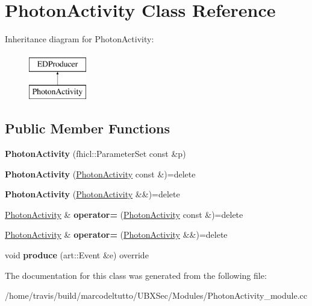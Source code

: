 \hypertarget{classPhotonActivity}{\section{Photon\-Activity Class Reference}
\label{classPhotonActivity}
}
Inheritance diagram for Photon\-Activity\-:\begin{figure}[H]
\begin{center}
\leavevmode
\includegraphics[height=2.000000cm]{classPhotonActivity}
\end{center}
\end{figure}
\subsection*{Public Member Functions}
\begin{DoxyCompactItemize}
\item 
\hypertarget{classPhotonActivity_a76dfd63b90435e0b7ec3b74ee15f7ac2}{{\bfseries Photon\-Activity} (fhicl\-::\-Parameter\-Set const \&p)}\label{classPhotonActivity_a76dfd63b90435e0b7ec3b74ee15f7ac2}

\item 
\hypertarget{classPhotonActivity_ac57409a0d4ddb84c398cb1f48e0be2ba}{{\bfseries Photon\-Activity} (\hyperlink{classPhotonActivity}{Photon\-Activity} const \&)=delete}\label{classPhotonActivity_ac57409a0d4ddb84c398cb1f48e0be2ba}

\item 
\hypertarget{classPhotonActivity_a70720c7ba6c072a45e2ba5c2fc7d2eba}{{\bfseries Photon\-Activity} (\hyperlink{classPhotonActivity}{Photon\-Activity} \&\&)=delete}\label{classPhotonActivity_a70720c7ba6c072a45e2ba5c2fc7d2eba}

\item 
\hypertarget{classPhotonActivity_ae49078c4335c58d17b7048766a4170c1}{\hyperlink{classPhotonActivity}{Photon\-Activity} \& {\bfseries operator=} (\hyperlink{classPhotonActivity}{Photon\-Activity} const \&)=delete}\label{classPhotonActivity_ae49078c4335c58d17b7048766a4170c1}

\item 
\hypertarget{classPhotonActivity_a5f0fe5dacc14362d3ff1700ae2743b7e}{\hyperlink{classPhotonActivity}{Photon\-Activity} \& {\bfseries operator=} (\hyperlink{classPhotonActivity}{Photon\-Activity} \&\&)=delete}\label{classPhotonActivity_a5f0fe5dacc14362d3ff1700ae2743b7e}

\item 
\hypertarget{classPhotonActivity_ab28c536cfa704815226ef9b8f7632694}{void {\bfseries produce} (art\-::\-Event \&e) override}\label{classPhotonActivity_ab28c536cfa704815226ef9b8f7632694}

\end{DoxyCompactItemize}


The documentation for this class was generated from the following file\-:\begin{DoxyCompactItemize}
\item 
/home/travis/build/marcodeltutto/\-U\-B\-X\-Sec/\-Modules/Photon\-Activity\-\_\-module.\-cc\end{DoxyCompactItemize}
